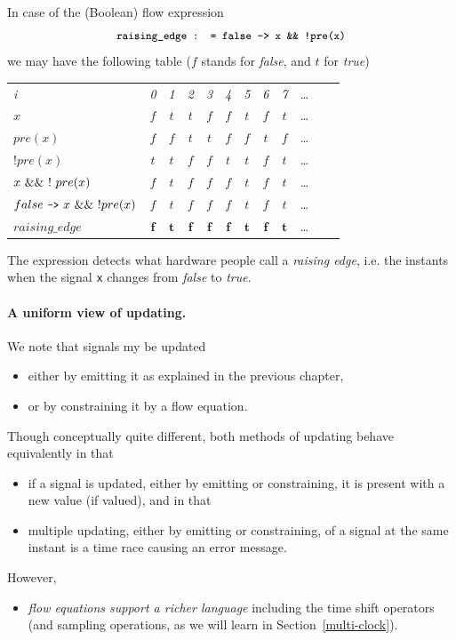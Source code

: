 In case of the (Boolean) flow expression 
%
$$\texttt{\small{raising\_edge : = false -> x \&\& !pre(x)}}$$
%
 we may have the following table ($f$ stands for \emph{false}, and 
$t$ for \emph{true}) 
\begin{center}
  \leavevmode
  \begin{tabular}[]{l@{}||@{\quad}ccccccccccc}
    \hline\hline
     \hbox{{\footnotesize \textit{i}}} &{\footnotesize \textit{0}}
     &{\footnotesize \textit{1}}&{\footnotesize \textit{2}}
     &{\footnotesize \textit{3}}&{\footnotesize \textit{4}}
     &{\footnotesize \textit{5}}&{\footnotesize \textit{6}}
     &{\footnotesize \textit{7}}&\ldots
   \\  
    \hbox{$x$}
    &$f$&$t$&$t$&$f$&$f$&$t$&$f$&$t$&\ldots
   \\ 
    \hbox{$pre(x)$} &$f$&$f$&$t$&$t$&$f$&$f$&$t$&$f$&\ldots
   \\    
    \hbox{$! pre(x)$} &$t$&$t$&$f$&$f$&$t$&$t$&$f$&$t$&\ldots
   \\
    \hbox{$x\ {\tiny \&\&}\ !\ pre(x)$} &$f$&$t$&$f$&$f$&$f$&$t$&$f$&$t$&\ldots
   \\
    \hbox{$false\ \pp{->}\ x\ {\tiny \&\&}\ !pre(x)$\quad}
		&$f$&$t$&$f$&$f$&$f$&$t$&$f$&$t$&\ldots
   \\
    \hbox{$raising\_edge$\quad}
		&$\mathbf{f}$&$\mathbf{t}$&$\mathbf{f}$&$\mathbf{f}$&
		$\mathbf{f}$&$\mathbf{t}$&$\mathbf{f}$&$\mathbf{t}$&\ldots
	\\   \hline\hline
  \end{tabular}
\end{center}
The expression detects what hardware people call a \emph{raising 
edge}, i.e. the instants when the signal \texttt{x} changes from \emph{false} 
to \emph{true}.

\paragraph{A uniform view of updating.}
We note that signals my be updated
\begin{itemize}
\item either by emitting it as explained in the previous chapter,

\item or by constraining it by a flow equation.
\end{itemize}
Though conceptually quite different, both methods of updating behave equivalently in that
\begin{itemize}
\item if a signal is updated, either by emitting or constraining, it is present with a new value (if valued), and in that

\item multiple updating, either by emitting or constraining, of a signal at 
the same instant is a time race causing an error message.
\end{itemize}
However,
\begin{itemize}
\item \emph{flow equations support a richer language} including the time 
shift operators (and sampling operations, as we will learn in Section~\ref{multi-clock}).
\end{itemize}
%


